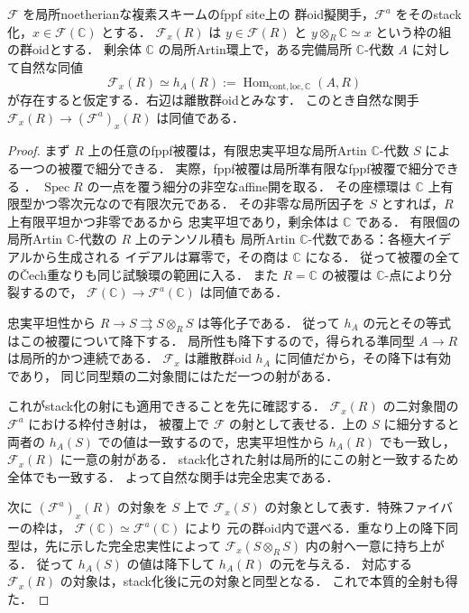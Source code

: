 \begin{lemma}[局所Artin基底上のstack化と枠付き変形]
\label{lem:artin-stackification-comparison}
$\mathcal F$ を局所noetherianな複素スキームのfppf site上の
群oid擬関手，$\mathcal F^a$ をそのstack化，$x\in\mathcal F(\mathbb C)$ とする．
$\mathcal F_x(R)$ は $y\in\mathcal F(R)$ と
$y\otimes_R\mathbb C\simeq x$ という枠の組の群oidとする．
剰余体 $\mathbb C$ の局所Artin環上で，ある完備局所
$\mathbb C$-代数 $A$ に対して自然な同値
\[
 \mathcal F_x(R)\simeq
 h_A(R):=\operatorname{Hom}_{\mathrm{cont,loc},\mathbb C}(A,R)
\]
が存在すると仮定する．右辺は離散群oidとみなす．
このとき自然な関手
$\mathcal F_x(R)\to(\mathcal F^a)_x(R)$ は同値である．
\end{lemma}
\begin{proof}
まず $R$ 上の任意のfppf被覆は，有限忠実平坦な局所Artin
$\mathbb C$-代数 $S$ による一つの被覆で細分できる．
実際，fppf被覆は局所準有限なfppf被覆で細分できる
\cite[Tag 0572]{StacksProject}．
$\operatorname{Spec}R$ の一点を覆う細分の非空なaffine開を取る．
その座標環は $\mathbb C$ 上有限型かつ零次元なので有限次元である．
その非零な局所因子を $S$ とすれば，$R$ 上有限平坦かつ非零であるから
忠実平坦であり，剰余体は $\mathbb C$ である．
有限個の局所Artin $\mathbb C$-代数の $R$ 上のテンソル積も
局所Artin $\mathbb C$-代数である：各極大イデアルから生成される
イデアルは冪零で，その商は $\mathbb C$ になる．
従って被覆の全ての\v{C}ech重なりも同じ試験環の範囲に入る．
また $R=\mathbb C$ の被覆は $\mathbb C$-点により分裂するので，
$\mathcal F(\mathbb C)\to\mathcal F^a(\mathbb C)$ は同値である．

忠実平坦性から $R\to S\rightrightarrows S\otimes_RS$ は等化子である．
従って $h_A$ の元とその等式はこの被覆について降下する．
局所性も降下するので，得られる準同型 $A\to R$ は局所的かつ連続である．
$\mathcal F_x$ は離散群oid $h_A$ に同値だから，その降下は有効であり，
同じ同型類の二対象間にはただ一つの射がある．

これがstack化の射にも適用できることを先に確認する．
$\mathcal F_x(R)$ の二対象間の $\mathcal F^a$ における枠付き射は，
被覆上で $\mathcal F$ の射として表せる．上の $S$ に細分すると
両者の $h_A(S)$ での値は一致するので，忠実平坦性から
$h_A(R)$ でも一致し，$\mathcal F_x(R)$ に一意の射がある．
stack化された射は局所的にこの射と一致するため全体でも一致する．
よって自然な関手は完全忠実である．

次に $(\mathcal F^a)_x(R)$ の対象を $S$ 上で
$\mathcal F_x(S)$ の対象として表す．特殊ファイバーの枠は，
$\mathcal F(\mathbb C)\simeq\mathcal F^a(\mathbb C)$ により
元の群oid内で選べる．重なり上の降下同型は，先に示した完全忠実性によって
$\mathcal F_x(S\otimes_RS)$ 内の射へ一意に持ち上がる．
従って $h_A(S)$ の値は降下して $h_A(R)$ の元を与える．
対応する $\mathcal F_x(R)$ の対象は，stack化後に元の対象と同型となる．
これで本質的全射も得た．
\end{proof}


